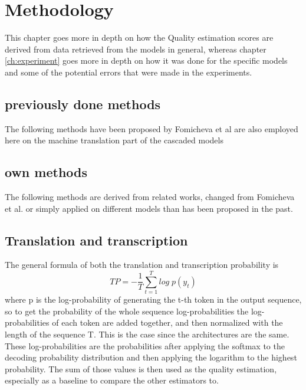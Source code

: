 
\chapter{Methodology}
\label{ch:methods}
This chapter goes more in depth on how the Quality estimation scores are derived from data retrieved from the models in general, whereas chapter \autoref{ch:experiment} goes more in depth on how it was done for the specific models and some of the potential errors that were made in the experiments.
\section{previously done methods}
The following methods have been proposed by Fomicheva et al \cite{fomicheva2020unsupervised} are also employed here on the machine translation part of the cascaded models

\section{own methods}
The following methods are derived from related works, changed from Fomicheva et al. or simply applied on different models than has been proposed in the past. 


\section{Translation and transcription}
The general formula of both the translation and transcription probability is $$TP=-\frac{1}{T}\sum_{t=1}^T log\; p(y_t) \label{formula:translation Probability}$$
where p is the log-probability of generating the t-th token in the output sequence, so to get the probability of the whole sequence log-probabilities the log-probabilities of each token are added together, and then normalized with the length of the sequence T. 
This is the case since the architectures are the same.
These log-probabilities are the probabilities after applying the softmax to the decoding probability distribution and then applying the logarithm to the highest probability.
The sum of those values is then used as the quality estimation, especially as a baseline to compare the other estimators to.


